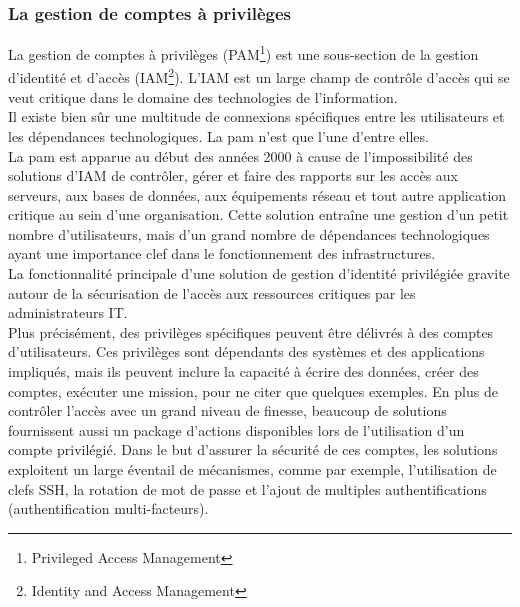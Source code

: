 \subsubsection{La gestion de comptes à privilèges}
La gestion de comptes à privilèges (PAM\footnote{Privileged Access Management}) est une sous-section de la gestion d’identité et d’accès (IAM\footnote{Identity and Access Management}). L’IAM est un large champ de contrôle d’accès qui se veut critique dans le domaine des technologies de l’information.\\
Il existe bien sûr une multitude de connexions spécifiques entre les utilisateurs et les dépendances technologiques. La \gls{pam} n’est que l’une d’entre elles.\\
La \gls{pam} est apparue au début des années 2000 à cause de l’impossibilité des solutions d’IAM de contrôler, gérer et faire des rapports sur les accès aux serveurs, aux bases de données, aux équipements réseau et tout autre application critique au sein d’une organisation. Cette solution entraîne une gestion d’un petit nombre d’utilisateurs, mais d’un grand nombre de dépendances technologiques ayant une importance clef dans le fonctionnement des infrastructures.\\
La fonctionnalité principale d’une solution de gestion d’identité privilégiée gravite autour de la sécurisation de l’accès aux ressources critiques par les administrateurs IT.\\
Plus précisément, des privilèges spécifiques peuvent être délivrés à des comptes d’utilisateurs. Ces privilèges sont dépendants des systèmes et des applications impliqués, mais ils peuvent inclure la capacité à écrire des données, créer des comptes, exécuter une mission, pour ne citer que quelques exemples. En plus de contrôler l’accès avec un grand niveau de finesse, beaucoup de solutions fournissent aussi un package d’actions disponibles lors de l’utilisation d’un compte privilégié. Dans le but d’assurer la sécurité de ces comptes, les solutions exploitent un large éventail de mécanismes, comme par exemple, l’utilisation de clefs SSH, la rotation de mot de passe et l’ajout de multiples authentifications (authentification multi-facteurs).\\
